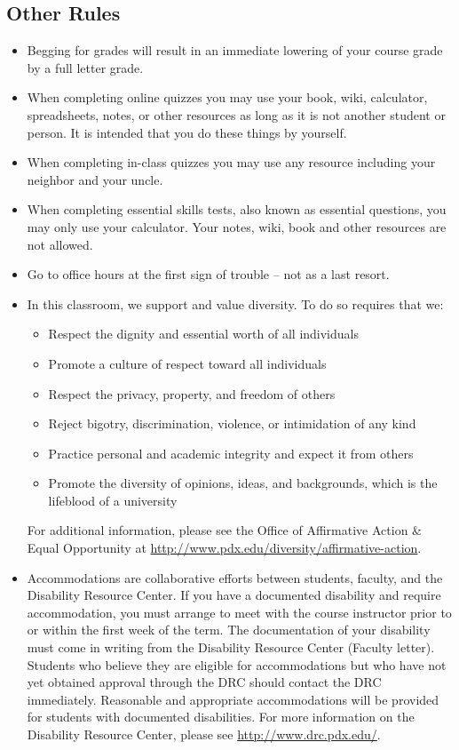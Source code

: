 \documentclass[letterpaper,10pt]{article}
\begin{document}
\subsection{Other Rules}
\begin{itemize}


\item Begging for grades will result in an immediate lowering of your
  course grade by a full letter grade.
  
  \item When completing online quizzes you may use your book, wiki, calculator, spreadsheets, notes, or other resources as long as it is not another student or person.  It is intended that you do these things by yourself.
  
  \item  When completing in-class quizzes you may use any resource including your neighbor and your uncle.
  
  \item When completing essential skills tests, also known as essential questions, you may only use your calculator.  Your notes, wiki, book and other resources are not allowed.

\item Go to office hours at the first sign of trouble -- not as a last
  resort.

\item In this classroom, we support and value diversity.  To do so requires that we:
\begin{itemize}
   \item Respect the dignity and essential worth of all individuals
   \item Promote a culture of respect toward all individuals
    \item Respect the privacy, property, and freedom of others
    \item Reject bigotry, discrimination, violence, or intimidation of any kind
    \item Practice personal and academic integrity and expect it from others
   \item Promote the diversity of opinions, ideas, and backgrounds, which is
    the lifeblood of a university
\end{itemize}

 For additional information, please see the Office of Affirmative Action \& Equal Opportunity at \url{http://www.pdx.edu/diversity/affirmative-action}.


\item Accommodations are collaborative efforts between students, faculty, and the Disability Resource Center.  If you have a documented disability and require accommodation, you must arrange to meet with the course instructor prior to or within the first week of the term.  The documentation of your disability must come in writing from the Disability Resource Center (Faculty letter).  Students who believe they are eligible for accommodations but who have not yet obtained approval through the DRC should contact the DRC immediately.  Reasonable and appropriate accommodations will be provided for students with documented disabilities.  For more information on the Disability Resource Center, please see \url{http://www.drc.pdx.edu/}. 


\end{itemize}
\end{document}
